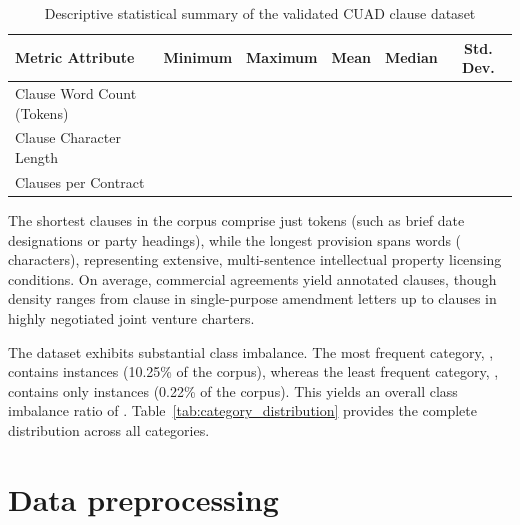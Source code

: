 \begin{table}[htbp]
\centering
\small
\begin{tabular}{lccccc}
\toprule
\textbf{Metric Attribute} & \textbf{Minimum} & \textbf{Maximum} & \textbf{Mean} & \textbf{Median} & \textbf{Std. Dev.} \\
\midrule
Clause Word Count (Tokens) & \MinWordCount{} & \MaxWordCount{} & \MeanWordCount{} & \MedianWordCount{} & \StdWordCount{} \\
Clause Character Length & \MinCharCount{} & \MaxCharCount{} & \MeanCharCount{} & \MedianCharCount{} & \StdCharCount{} \\
Clauses per Contract & \MinClausesPerContract{} & \MaxClausesPerContract{} & \MeanClausesPerContract{} & \MedianClausesPerContract{} & \StdClausesPerContract{} \\
\bottomrule
\end{tabular}
\caption{Descriptive statistical summary of the validated CUAD clause dataset}\label{tab:dataset_summary_statistics}
\end{table}

The shortest clauses in the corpus comprise just \MinWordCount{} tokens (such as brief date designations or party headings), while the longest provision spans \MaxWordCount{} words (\MaxCharCount{} characters), representing extensive, multi-sentence intellectual property licensing conditions. On average, commercial agreements yield \MeanClausesPerContract{} annotated clauses, though density ranges from \MinClausesPerContract{} clause in single-purpose amendment letters up to \MaxClausesPerContract{} clauses in highly negotiated joint venture charters.

The dataset exhibits substantial class imbalance. The most frequent category, \textit{\MostFrequentCategory{}}, contains \MostFrequentCategoryCount{} instances (10.25\% of the corpus), whereas the least frequent category, \textit{\LeastFrequentCategory{}}, contains only \LeastFrequentCategoryCount{} instances (0.22\% of the corpus). This yields an overall class imbalance ratio of \ImbalanceRatio{}. Table~\ref{tab:category_distribution} provides the complete distribution across all \NumClasses{} categories.



\section{Data preprocessing}
\label{sec:data_preprocessing}


